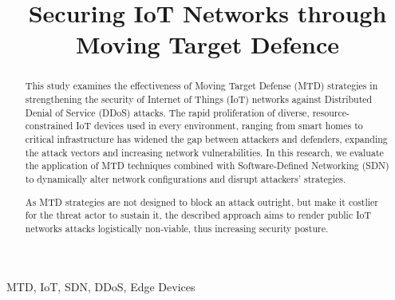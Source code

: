 \documentclass[conference]{IEEEtran}
\begin{document}
\title{Securing IoT Networks through Moving Target Defence}

\author{
\and
{}
}
\maketitle

\begin{abstract}
This study examines the effectiveness of Moving Target Defense (MTD) strategies in strengthening the security of Internet of Things (IoT) networks against Distributed Denial of Service (DDoS) attacks. The rapid proliferation of diverse, resource-constrained IoT devices used in every environment, ranging from smart homes to critical infrastructure has widened the gap between attackers and defenders, expanding the attack vectors and increasing network vulnerabilities. In this research, we evaluate the application of MTD techniques combined with Software-Defined Networking (SDN) to dynamically alter network configurations and disrupt attackers' strategies. 

As MTD strategies are not designed to block an attack outright, but make it costlier for the threat actor to sustain it, the described approach aims to render public IoT networks attacks logistically non-viable, thus increasing security posture. 

\end{abstract}

\begin{IEEEkeywords}
MTD, IoT, SDN, DDoS, Edge Devices
\end{IEEEkeywords}
\end{document}
